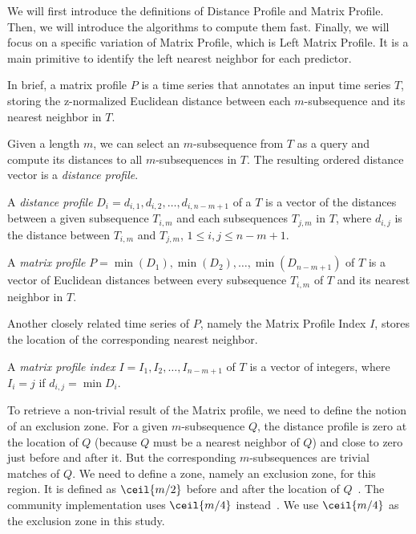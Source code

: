We will first introduce the definitions of Distance Profile and Matrix Profile.
Then, we will introduce the algorithms to compute them fast.
Finally, we will focus on a specific variation of Matrix Profile, which is Left Matrix Profile.
It is a main primitive to identify the left nearest neighbor for each predictor.

In brief, a matrix profile $P$ is a time series that annotates an input time series $T$, storing the z-normalized Euclidean distance between each $m$-subsequence and its nearest neighbor in $T$.

Given a length $m$, we can select an $m$-subsequence from $T$ as a query and compute its distances to all $m$-subsequences in $T$. The resulting ordered distance vector is a \textit{distance profile}.
\begin{definition}
    A \textit{distance profile} $D_i = d_{i, 1}, d_{i, 2}, \dots, d_{i, n-m+1}$ of a $T$ is a vector of the distances between a given subsequence $T_{i, m}$ and each subsequences $T_{j, m}$ in $T$, where $d_{i, j}$ is the distance between $T_{i, m}$ and $T_{j, m}$, $1 \leq i, j \leq n-m+1$.
\end{definition}

\begin{definition}
    A \textit{matrix profile} $P = \min(D_1), \min(D_2), \dots, $$\min(D_{n-m+1})$ of $T$ is a vector of Euclidean distances between every subsequence $T_{i, m}$ of $T$ and its nearest neighbor in $T$.
\end{definition}

Another closely related time series of $P$, namely the Matrix Profile Index $I$, stores the location of the corresponding nearest neighbor.

\begin{definition}
    A \textit{matrix profile index} $I = I_1, I_2, \dots, I_{n-m+1}$ of $T$ is a vector of integers, where $I_i = j$ if $d_{i, j} = \min{D_i}$.
\end{definition}

To retrieve a non-trivial result of the Matrix profile, we need to define the notion of an exclusion zone.
For a given $m$-subsequence $Q$, the distance profile is zero at the location of $Q$ (because $Q$ must be a nearest neighbor of $Q$) and close to zero just before and after it.
But the corresponding $m$-subsequences are trivial matches of $Q$.
We need to define a zone, namely an exclusion zone, for this region.
It is defined as $\ceil{m/2}$ before and after the location of $Q$~\cite{yeh2016matrix}. The community implementation uses $\ceil{m/4}$ instead~\cite{law2019stumpy}.
We use $\ceil{m/4}$ as the exclusion zone in this study.

